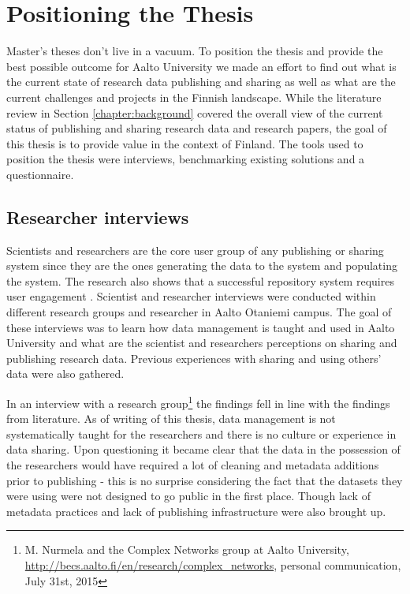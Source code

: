 \chapter{Positioning the Thesis}
\label{chapter:positioning}

Master's theses don't live in a vacuum. To position the thesis and provide the
best possible outcome for Aalto University we made an effort to find out what
is the current state of research data publishing and sharing as well as what
are the current challenges and projects in the Finnish landscape. While the
literature review in Section \ref{chapter:background} covered the overall view
of the current status of publishing and sharing research data and research
papers, the goal of this thesis is to provide value in the context of Finland.
The tools used to position the thesis were interviews, benchmarking existing
solutions and a questionnaire.

\section{Researcher interviews}
\label{sec:expert_interviews}

Scientists and researchers are the core user group of any publishing or sharing
system since they are the ones generating the data to the system and populating
the system. The research also shows that a successful repository system requires
user engagement \cite{DBLP:conf/ercimdl/Martinez-UribeM09}. Scientist and
researcher interviews were conducted within different research groups and
researcher in Aalto Otaniemi campus. The goal of these interviews was to learn
how data management is taught and used in Aalto University and what are the
scientist and researchers perceptions on sharing and publishing research data.
Previous experiences with sharing and using others' data were also gathered.

In an interview with a research group\footnote{M. Nurmela and the Complex
Networks group at Aalto University, \url{http://becs.aalto.fi/en/research/complex\_networks},
personal communication, July 31st, 2015} the findings fell in line with the
findings from literature. As of writing of this thesis, data management is not
systematically taught for the researchers and
there is no culture or experience in data sharing. Upon questioning it became
clear that the data in the possession of the researchers would have required
a lot of cleaning and metadata additions prior to publishing - this is no surprise
considering the fact that the datasets they were using were not designed to
go public in the first place. Though lack of metadata practices and lack of
publishing infrastructure were also brought up.

